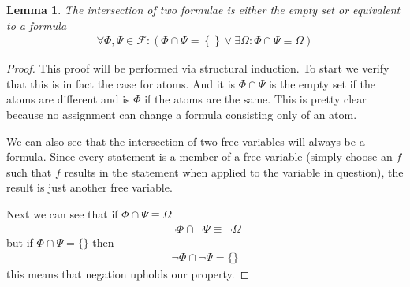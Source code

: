\documentclass{article}
\newtheorem{lem}{Lemma}
\begin{document}
\begin{lem}
The intersection of two formulae is either the empty set or equivalent to a formula
\begin{align*}
\forall \Phi,\Psi \in \mathcal{F} : \left(\Phi \cap \Psi = \left\{\right\} \lor \exists \Omega : \Phi \cap \Psi \equiv \Omega \right)
\end{align*}
\end{lem}
\begin{proof}
This proof will be performed via structural induction.
To start we verify that this is in fact the case for atoms.
And it is $\Phi \cap \Psi$ is the empty set if the atoms are different and is $\Phi$ if the atoms are the same.
This is pretty clear because no assignment can change a formula consisting only of an atom.

We can also see that the intersection of two free variables will always be a formula.
Since every statement is a member of a free variable (simply choose an $f$ such that $f$ results in the statement when applied to the variable in question),
the result is just another free variable.

Next we can see that if $\Phi \cap \Psi \equiv \Omega$
\begin{align*}
\neg \Phi \cap \neg \Psi \equiv \neg \Omega
\end{align*}
but if $\Phi \cap \Psi = \{\}$ then
\begin{align*}
\neg \Phi \cap \neg \Psi = \{\}
\end{align*}
this means that negation upholds our property.


\end{proof}
\end{document}
